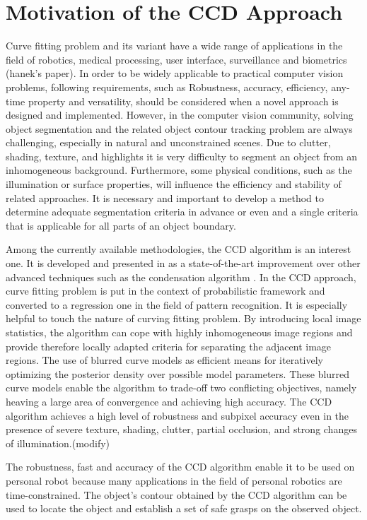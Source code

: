 \section{Motivation of the CCD Approach}
\label{sec:mccd}
Curve fitting problem and its variant have a wide range of
applications in the field of robotics, medical processing, user
interface, surveillance and biometrics (hanek's paper). In order to be
widely applicable to practical computer vision problems, following
requirements, such as Robustness,
accuracy, efficiency, any-time property and versatility, should be
considered when a novel approach is designed and implemented.
However, in the computer vision community, solving object segmentation and the
related object contour tracking problem are always challenging,
especially in natural and unconstrained scenes. Due to clutter,
shading, texture, and highlights it is very difficulty to segment
an object from an inhomogeneous background. Furthermore, some physical
conditions, such as the illumination or surface properties, will
influence the efficiency and stability of related approaches. It is
necessary and important to develop a method to determine adequate segmentation
criteria in advance or even and a single criteria that is applicable
for all parts of an object boundary.

Among the currently available methodologies, the CCD algorithm is an
interest one. It is developed and presented in as a state-of-the-art
improvement over other advanced techniques such as the condensation
algorithm \cite{panin2006fully}. In the CCD approach, curve fitting problem is
put in the context of probabilistic framework and converted to a
regression one in the field of pattern recognition. It is especially
helpful to touch the nature of curving fitting problem. By introducing
local image statistics, the algorithm can cope with highly
inhomogeneous image regions and provide therefore locally adapted
criteria for separating the adjacent image regions. The use of blurred
curve models as efficient means for iteratively optimizing the
posterior density over possible model parameters. These blurred curve
models enable the algorithm to trade-off two conflicting objectives,
namely heaving a large area of convergence and achieving high
accuracy. The CCD algorithm achieves a high level of robustness and subpixel
accuracy even in the presence of severe texture, shading, clutter,
partial occlusion, and strong changes of illumination.(modify)

The robustness, fast and accuracy of the CCD algorithm enable it 
to be used on personal robot  because many applications in the field
of personal robotics are time-constrained. The object's contour
obtained by the CCD algorithm can be used to locate the object and
establish a set of safe grasps on the observed object\cite{hanek2000vision}.




